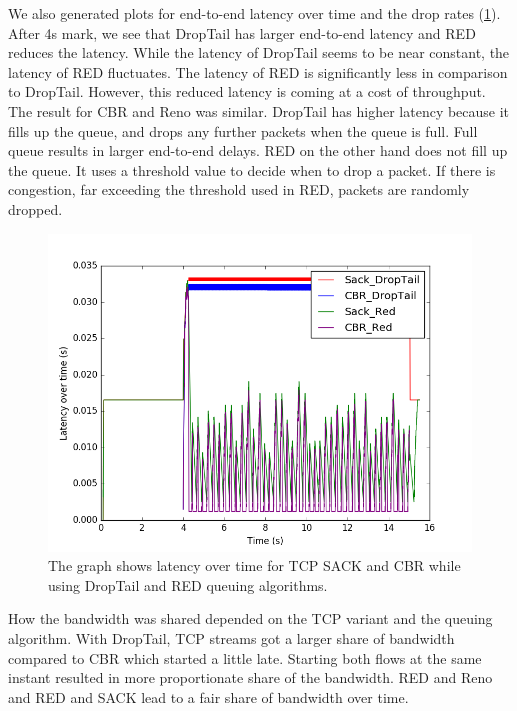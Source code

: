 We also generated plots for end-to-end latency over time and the drop rates (\ref{fig:Queuing_Latency_Sack_100}). After 4s mark, we see that DropTail has larger end-to-end latency and RED reduces the latency. While the latency of DropTail seems to be near constant, the latency of RED fluctuates. The latency of RED is significantly less in comparison to DropTail. However, this reduced latency is coming at a cost of throughput. The result for CBR and Reno was similar. DropTail has higher latency because it fills up the queue, and drops any further packets when the queue is full. Full queue results in larger end-to-end delays. RED on the other hand does not fill up the queue. It uses a threshold value to decide when to drop a packet. If there is congestion, far exceeding the threshold used in RED, packets are randomly dropped.
\begin{figure}[!htbp]
	\includegraphics[scale=0.4]{Queuing_Latency_Sack_100.png}
	\caption{The graph shows latency over time for TCP SACK and CBR while using DropTail and RED queuing algorithms.}
	\label{fig:Queuing_Latency_Sack_100}
\end{figure}
How the bandwidth was shared depended on the TCP variant and the queuing algorithm. With DropTail, TCP streams got a larger share of bandwidth compared to CBR which started a little late. Starting both flows at the same instant resulted in more proportionate share of the bandwidth. RED and Reno and RED and SACK lead to a fair share of bandwidth over time.


